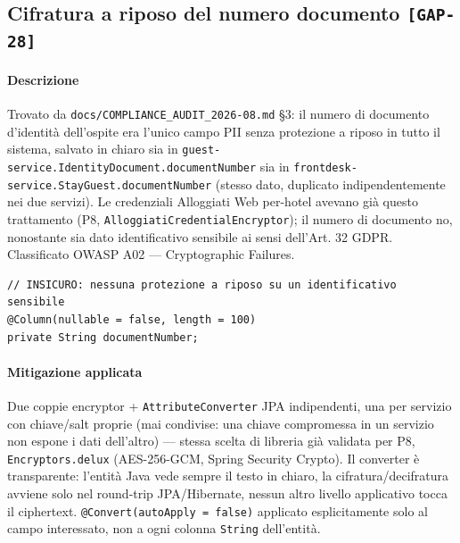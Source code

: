 ﻿\documentclass[a4paper,12pt]{report}
\newcommand{\threat}[1]{\texttt{\small\textcolor{vulnred}{[#1]}}}
\begin{document}
\subsection{Cifratura a riposo del numero documento \threat{GAP-28}}

\paragraph{Descrizione}
Trovato da \texttt{docs/COMPLIANCE\_AUDIT\_2026-08.md} \S3: il numero di
documento d'identità dell'ospite era l'unico campo PII senza protezione a
riposo in tutto il sistema, salvato in chiaro sia in
\texttt{guest-service.IdentityDocument.documentNumber} sia in
\texttt{frontdesk-service.StayGuest.documentNumber} (stesso dato,
duplicato indipendentemente nei due servizi). Le credenziali Alloggiati Web
per-hotel avevano già questo trattamento (P8,
\texttt{AlloggiatiCredentialEncryptor}); il numero di documento no,
nonostante sia dato identificativo sensibile ai sensi dell'Art. 32 GDPR.
Classificato OWASP A02 --- Cryptographic Failures.

\begin{insecurebox}[title={IdentityDocument.java --- campo in chiaro (baseline)}]
\begin{lstlisting}[style=java]
// INSICURO: nessuna protezione a riposo su un identificativo sensibile
@Column(nullable = false, length = 100)
private String documentNumber;
\end{lstlisting}
\end{insecurebox}

\paragraph{Mitigazione applicata}
Due coppie encryptor + \texttt{AttributeConverter} JPA indipendenti, una
per servizio con chiave/salt proprie (mai condivise: una chiave compromessa
in un servizio non espone i dati dell'altro) --- stessa scelta di libreria
già validata per P8, \texttt{Encryptors.delux} (AES-256-GCM, Spring
Security Crypto). Il converter è transparente: l'entità Java vede sempre il
testo in chiaro, la cifratura/decifratura avviene solo nel round-trip
JPA/Hibernate, nessun altro livello applicativo tocca il ciphertext.
\texttt{@Convert(autoApply = false)} applicato esplicitamente solo al
campo interessato, non a ogni colonna \texttt{String} dell'entità.
\end{document}
